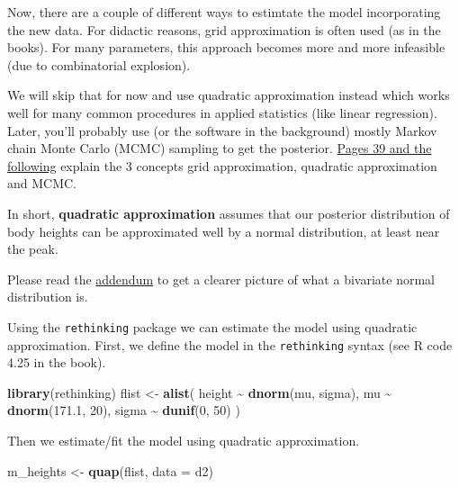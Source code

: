 \documentclass[
]{book}
\newenvironment{Shaded}{\begin{snugshade}}{\end{snugshade}}
\newcommand{\AttributeTok}[1]{\textcolor[rgb]{0.13,0.29,0.53}{#1}}
\newcommand{\DecValTok}[1]{\textcolor[rgb]{0.00,0.00,0.81}{#1}}
\newcommand{\FloatTok}[1]{\textcolor[rgb]{0.00,0.00,0.81}{#1}}
\newcommand{\FunctionTok}[1]{\textcolor[rgb]{0.13,0.29,0.53}{\textbf{#1}}}
\newcommand{\NormalTok}[1]{#1}
\newcommand{\OtherTok}[1]{\textcolor[rgb]{0.56,0.35,0.01}{#1}}
\newcommand{\SpecialCharTok}[1]{\textcolor[rgb]{0.81,0.36,0.00}{\textbf{#1}}}
\begin{document}
Now, there are a couple of different ways to estimtate the model incorporating
the new data. For didactic reasons, grid approximation is often used (as in the books).
For many parameters, this approach becomes more and more infeasible (due to combinatorial explosion).

We will skip that for now and use quadratic approximation instead which
works well for many common procedures in applied statistics (like linear regression).
Later, you'll probably use (or the software in the background) mostly Markov
chain Monte Carlo (MCMC) sampling to get the posterior.
\href{https://civil.colorado.edu/~balajir/CVEN6833/bayes-resources/RM-StatRethink-Bayes.pdf}{Pages 39 and the following}
explain the 3 concepts grid approximation, quadratic approximation and MCMC.

In short, \textbf{quadratic approximation} assumes that our posterior distribution
of body heights can be approximated well by a normal distribution,
at least near the peak.

Please read the \hyperref[bivariate_normal]{addendum} to get a clearer picture of
what a bivariate normal distribution is.

Using the \texttt{rethinking} package we can estimate the model using quadratic approximation.
First, we define the model in the \texttt{rethinking} syntax (see R code 4.25 in the book).

\begin{Shaded}
\begin{Highlighting}[]
\FunctionTok{library}\NormalTok{(rethinking)}
\NormalTok{flist }\OtherTok{\textless{}{-}} \FunctionTok{alist}\NormalTok{(}
\NormalTok{  height }\SpecialCharTok{\textasciitilde{}} \FunctionTok{dnorm}\NormalTok{(mu, sigma),}
\NormalTok{  mu }\SpecialCharTok{\textasciitilde{}} \FunctionTok{dnorm}\NormalTok{(}\FloatTok{171.1}\NormalTok{, }\DecValTok{20}\NormalTok{),}
\NormalTok{  sigma }\SpecialCharTok{\textasciitilde{}} \FunctionTok{dunif}\NormalTok{(}\DecValTok{0}\NormalTok{, }\DecValTok{50}\NormalTok{)}
\NormalTok{)}
\end{Highlighting}
\end{Shaded}

Then we estimate/fit the model using quadratic approximation.

\begin{Shaded}
\begin{Highlighting}[]
\NormalTok{m\_heights }\OtherTok{\textless{}{-}} \FunctionTok{quap}\NormalTok{(flist, }\AttributeTok{data =}\NormalTok{ d2)}
\end{Highlighting}
\end{Shaded}
\end{document}
